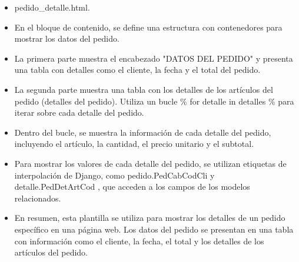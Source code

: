\documentclass{article}
\begin{document}
    
    \begin{itemize}
        \item pedido\_detalle.html.
        \item En el bloque de contenido, se define una estructura con contenedores para mostrar los datos del pedido.
        \item La primera parte muestra el encabezado "DATOS DEL PEDIDO" y presenta una tabla con detalles como el cliente, la fecha y el total del pedido.
        \item La segunda parte muestra una tabla con los detalles de los artículos del pedido (detalles del pedido). Utiliza un bucle {\% for detalle in detalles \%} para iterar sobre cada detalle del pedido.
        \item Dentro del bucle, se muestra la información de cada detalle del pedido, incluyendo el artículo, la cantidad, el precio unitario y el subtotal.
        \item Para mostrar los valores de cada detalle del pedido, se utilizan etiquetas de interpolación de Django, como {{ pedido.PedCabCodCli }} y {{ detalle.PedDetArtCod }}, que acceden a los campos de los modelos relacionados.
        \item En resumen, esta plantilla se utiliza para mostrar los detalles de un pedido específico en una página web. Los datos del pedido se presentan en una tabla con información como el cliente, la fecha, el total y los detalles de los artículos del pedido.
    \end{itemize}
    
    
\end{document}
